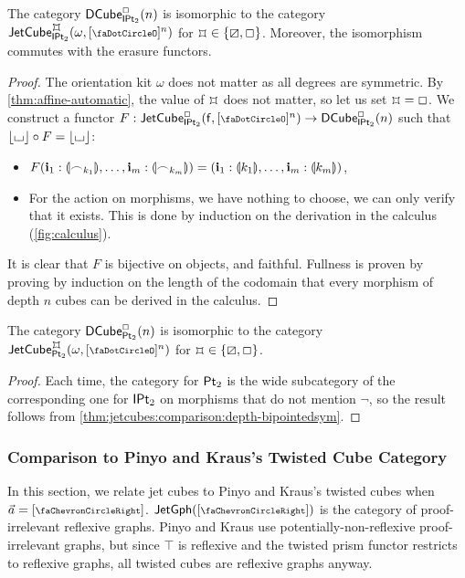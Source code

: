 \documentclass[a4paper]{memoir}
\begin{document}
\begin{proposition} \label{thm:jetcubes:comparison:depth-bipointedsym}
	The category ${\mathsf{DCube}}^{\Box}_{{\mathsf{IPt}_2}}\mathopen{}\left( n \right)\mathclose{}$ is isomorphic to the category $\jetcube \omega \mycubex \bipointedsym {[\npolar]^n}$ for $\mycubex \in \accol{\cartes, \affine}$.
	Moreover, the isomorphism commutes with the erasure functors.
\end{proposition}
\begin{proof}
	The orientation kit $\omega$ does not matter as all degrees are symmetric.
	By \cref{thm:affine-automatic}, the value of $\mycubex$ does not matter, so let us set $\mycubex = \affine$.
	We construct a functor $F : \jetcubefwd \affine \bipointedsym {[\npolar]^n} \to \dcubeopt \affine \bipointedsym n$ such that $\mathopen{}\left\lfloor {\llcorner\hspace{-.4ex}\lrcorner} \right\rfloor\mathclose{} \circ F = \mathopen{}\left\lfloor {\llcorner\hspace{-.4ex}\lrcorner} \right\rfloor\mathclose{}$:
	\begin{itemize}
		\item $F(\mathbf{i}_1 : {\llparenthesis \frown_{k_1} \rrparenthesis}, \ldots, \mathbf{i}_m : {\llparenthesis \frown_{k_m} \rrparenthesis}) = (\mathbf{i}_1 : {\llparenthesis k_1 \rrparenthesis}, \ldots, \mathbf{i}_m : {\llparenthesis k_m \rrparenthesis})$,
		\item For the action on morphisms, we have nothing to choose, we can only verify that it exists. This is done by induction on the derivation in the calculus (\cref{fig:calculus}).
	\end{itemize}
	
	It is clear that $F$ is bijective on objects, and faithful.
	Fullness is proven by proving by induction on the length of the codomain that every morphism of depth $n$ cubes can be derived in the calculus.
\end{proof}

\begin{proposition} \label{thm:jetcubes:comparison:depth-bipointed}
	The category ${\mathsf{DCube}}^{\Box}_{{\mathsf{Pt}_2}}\mathopen{}\left( n \right)\mathclose{}$ is isomorphic to the category $\jetcube \omega \mycubex \bipointed {[\npolar]^n}$ for $\mycubex \in \accol{\cartes, \affine}$.
\end{proposition}
\begin{proof}
	Each time, the category for ${\mathsf{Pt}_2}$ is the wide subcategory of the corresponding one for ${\mathsf{IPt}_2}$ on morphisms that do not mention $\lnot$, so the result follows from \cref{thm:jetcubes:comparison:depth-bipointedsym}.
\end{proof}

\subsubsection{Comparison to Pinyo and Kraus's Twisted Cube Category}
In this section, we relate jet cubes to Pinyo and Kraus's twisted cubes \cite{pinyo-twisted} when $\vec a = [\ypolar]$.
$\jetgph{[\ypolar]}$ is the category of proof-irrelevant reflexive graphs.
Pinyo and Kraus use potentially-non-reflexive proof-irrelevant graphs, but since $\top$ is reflexive and the twisted prism functor \cite[def.\ 4]{pinyo-twisted} restricts to reflexive graphs, all twisted cubes are reflexive graphs anyway.
\end{document}
